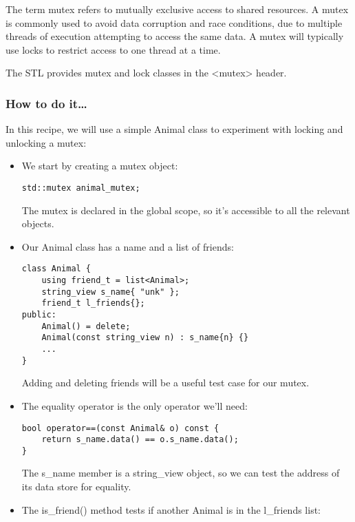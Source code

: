 
The term mutex refers to mutually exclusive access to shared resources. A mutex is commonly used to avoid data corruption and race conditions, due to multiple threads of execution attempting to access the same data. A mutex will typically use locks to restrict access to one thread at a time.

The STL provides mutex and lock classes in the <mutex> header.


\subsubsection{How to do it…}

In this recipe, we will use a simple Animal class to experiment with locking and unlocking a mutex:

\begin{itemize}
\item 
We start by creating a mutex object:

\begin{lstlisting}[style=styleCXX]
std::mutex animal_mutex;
\end{lstlisting}

The mutex is declared in the global scope, so it's accessible to all the relevant objects.

\item 
Our Animal class has a name and a list of friends:

\begin{lstlisting}[style=styleCXX]
class Animal {
	using friend_t = list<Animal>;
	string_view s_name{ "unk" };
	friend_t l_friends{};
public:
	Animal() = delete;
	Animal(const string_view n) : s_name{n} {}
	...
}
\end{lstlisting}

Adding and deleting friends will be a useful test case for our mutex.

\item 
The equality operator is the only operator we'll need:

\begin{lstlisting}[style=styleCXX]
bool operator==(const Animal& o) const {
	return s_name.data() == o.s_name.data();
}
\end{lstlisting}

The s\_name member is a string\_view object, so we can test the address of its data store for equality.

\item 
The is\_friend() method tests if another Animal is in the l\_friends list:


\end{itemize}

